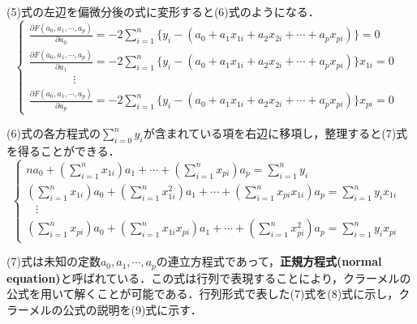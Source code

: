 \documentclass[dvipdfmx]{jsarticle}
\begin{document}
(5)式の左辺を偏微分後の式に変形すると(6)式のようになる．
\begin{equation}
  \begin{cases}
    \displaystyle
    \frac{\partial F(a_0,a_1,\cdots,a_p)}{\partial a_0} = -2\sum_{i=1}^n \{ y_i - (a_0 + a_1x_{1i}+a_2x_{2i}+\cdots + a_p x_{pi})\} = 0       & \\
    \displaystyle
    \frac{\partial F(a_0,a_1,\cdots,a_p)}{\partial a_1} = -2\sum_{i=1}^n \{ y_i - (a_0 + a_1x_{1i}+a_2x_{2i}+\cdots + a_p x_{pi})\}x_{1i} = 0 & \\
    \displaystyle
    \; \; \; \; \; \; \; \; \; \; \; \; \; \; \vdots                                                                                            \\
    \displaystyle
    \frac{\partial F(a_0,a_1,\cdots,a_p)}{\partial a_p} = -2\sum_{i=1}^n \{ y_i - (a_0 + a_1x_{1i}+a_2x_{2i}+\cdots + a_p x_{pi})\}x_{pi} = 0 &
  \end{cases}
\end{equation}

(6)式の各方程式の$\displaystyle \sum_{i=0}^n y_i$が含まれている項を右辺に移項し，整理すると(7)式を得ることができる．
\begin{equation}
  \begin{cases}
    \displaystyle
    na_0+\left(\sum_{i=1}^n x_{1i}\right)a_1+\cdots+\left(\sum_{i=1}^n x_{pi}\right)a_p=\sum_{i=1}^ny_i                                                & \\
    \displaystyle
    \left(\sum_{i=1}^n x_{1i}\right)a_0+\left(\sum_{i=1}^n x_{1i}^2\right)a_1+\cdots+\left(\sum_{i=1}^n x_{pi}x_{1i}\right)a_p=\sum_{i=1}^ny_i x_{1i}  & \\
    \displaystyle
    \; \; \; \vdots                                                                                                                                      \\
    \displaystyle
    \left(\sum_{i=1}^n x_{pi}\right)a_0+\left(\sum_{i=1}^n x_{1i}x_{pi}\right)a_1+\cdots+\left(\sum_{i=1}^n x_{pi}^2\right)a_p=\sum_{i=1}^ny_i x_{pi} &
  \end{cases}
\end{equation}

(7)式は未知の定数$a_0,a_1,\cdots,a_p$の連立方程式であって，\textbf{正規方程式(normal equation)}と呼ばれている．この式は行列で表現することにより，クラーメルの公式を用いて解くことが可能である．行列形式で表した(7)式を(8)式に示し，クラーメルの公式の説明を(9)式に示す．
\end{document}
